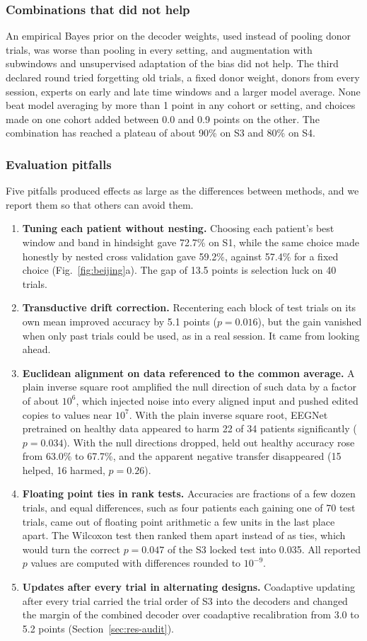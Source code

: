 \documentclass{ieeeaccess}
\begin{document}
\subsubsection{Combinations that did not help} An empirical Bayes prior on the decoder weights, used instead of pooling donor trials, was worse than pooling in every setting, and augmentation with subwindows and unsupervised adaptation of the bias did not help. The third declared round tried forgetting old trials, a fixed donor weight, donors from every session, experts on early and late time windows and a larger model average. None beat model averaging by more than 1 point in any cohort or setting, and choices made on one cohort added between 0.0 and 0.9 points on the other. The combination has reached a plateau of about 90\% on S3 and 80\% on S4.

\subsubsection{Evaluation pitfalls} Five pitfalls produced effects as large as the differences between methods, and we report them so that others can avoid them.
\begin{enumerate}
\item \textbf{Tuning each patient without nesting.} Choosing each patient's best window and band in hindsight gave 72.7\% on S1, while the same choice made honestly by nested cross validation gave 59.2\%, against 57.4\% for a fixed choice (Fig.~\ref{fig:beijing}a). The gap of 13.5 points is selection luck on 40 trials.
\item \textbf{Transductive drift correction.} Recentering each block of test trials on its own mean improved accuracy by 5.1 points ($p = 0.016$), but the gain vanished when only past trials could be used, as in a real session. It came from looking ahead.
\item \textbf{Euclidean alignment on data referenced to the common average.} A plain inverse square root amplified the null direction of such data by a factor of about $10^6$, which injected noise into every aligned input and pushed edited copies to values near $10^7$. With the plain inverse square root, EEGNet pretrained on healthy data appeared to harm 22 of 34 patients significantly ($p = 0.034$). With the null directions dropped, held out healthy accuracy rose from 63.0\% to 67.7\%, and the apparent negative transfer disappeared (15 helped, 16 harmed, $p = 0.26$).
\item \textbf{Floating point ties in rank tests.} Accuracies are fractions of a few dozen trials, and equal differences, such as four patients each gaining one of 70 test trials, came out of floating point arithmetic a few units in the last place apart. The Wilcoxon test then ranked them apart instead of as ties, which would turn the correct $p = 0.047$ of the S3 locked test into 0.035. All reported $p$ values are computed with differences rounded to $10^{-9}$.
\item \textbf{Updates after every trial in alternating designs.} Coadaptive updating after every trial carried the trial order of S3 into the decoders and changed the margin of the combined decoder over coadaptive recalibration from 3.0 to 5.2 points (Section~\ref{sec:res-audit}).
\end{enumerate}
\end{document}
